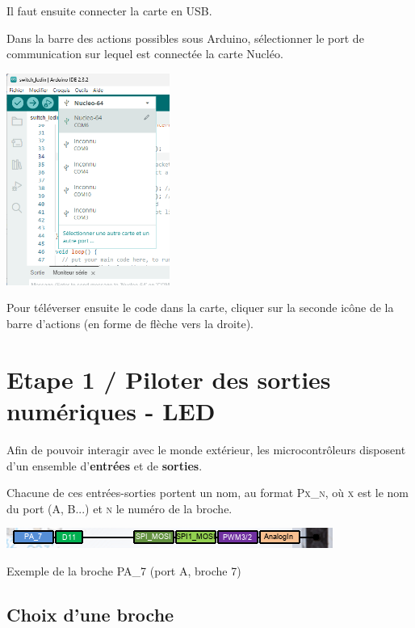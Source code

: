 \documentclass[a4paper,11pt,titlepage]{article} %
\begin{document}
Il faut ensuite connecter la carte en USB.

Dans la barre des actions possibles sous Arduino, sélectionner le port de communication sur lequel est connectée la carte Nucléo.

\begin{center}
	\includegraphics[width=0.4\textwidth]{images/arduino_cartes_nucleo_comXX.png}
\end{center}

Pour téléverser ensuite le code dans la carte, cliquer sur la seconde icône de la barre d'actions (en forme de flèche vers la droite).



\cleardoublepage
\section{Etape 1 / Piloter des sorties numériques - LED}

Afin de pouvoir interagir avec le monde extérieur, les microcontrôleurs disposent d'un ensemble d'\textbf{entrées} et de \textbf{sorties}. 

Chacune de ces entrées-sorties portent un nom, au format \textsc{Px\_n}, où \textsc{x} est le nom du port (A, B...) et \textsc{n} le numéro de la broche.

\begin{center}
	\includegraphics{images/nucleo_pin_functions.png}
	
	Exemple de la broche PA\_7 (port A, broche 7)
\end{center}


\subsection{Choix d'une broche}
\end{document}
